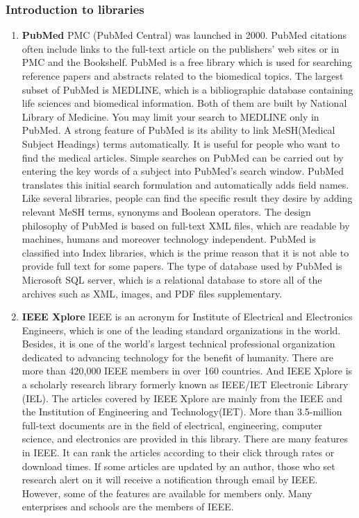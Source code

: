 \subsubsection{Introduction to libraries }

\begin{enumerate}
	
	\item\textbf{PubMed}
	\setlength{\parindent}{1em}
	 PMC (PubMed Central) was launched in 2000.
	 PubMed citations often include links to the full-text article on the publishers' web sites or in PMC and the Bookshelf.
	 PubMed is a free library which is used for searching reference papers and abstracts related to the biomedical topics.
	 The largest subset of PubMed is MEDLINE, which is a bibliographic database containing life sciences and biomedical information.
	 Both of them are built by National Library of Medicine. You may limit your search to MEDLINE only in PubMed.
	 A strong feature of PubMed is its ability to link MeSH(Medical Subject Headings) terms automatically. 
	 It is useful for people who want to find the medical articles. 
     Simple searches on PubMed can be carried out by entering the key words of a subject into PubMed's search window.
     PubMed translates this initial search formulation and automatically adds field names.
	 Like several libraries, people can find the specific result they desire by adding relevant MeSH terms, synonyms and Boolean operators.	 
	 The design philosophy of PubMed is based on full-text XML files, which are readable by machines, humans and moreover technology independent.
	 PubMed is classified into Index libraries, which is the prime reason that it is not able to provide full text for some papers.
	 The type of database used by PubMed is Microsoft SQL server, which is a relational database to store all of the archives such as XML, images, and PDF files supplementary.
	
	\item\textbf{IEEE Xplore}
	\setlength{\parindent}{1em}	
	IEEE is an acronym for Institute of Electrical and Electronics Engineers, which is one of the leading standard organizations in the world. 
	Besides, it is one of the world's largest technical professional organization dedicated to advancing technology for the benefit of humanity. 
	There are more than 420,000 IEEE members in over 160 countries.
	And IEEE Xplore is a scholarly research library formerly known as IEEE/IET Electronic Library (IEL).
	The articles covered by IEEE Xplore are mainly from the IEEE and the Institution of Engineering and Technology(IET).
	More than 3.5-million full-text documents are in the field of electrical, engineering, computer science, and electronics are provided in this library. 
	There are many features in IEEE. It can rank the articles according to their click through rates or download times. 
    If some articles are updated by an author, those who set research alert on it will receive a notification through email by IEEE.
    However, some of the features are available for members only.
    Many enterprises and schools are the members of IEEE.
    

\end{enumerate}

